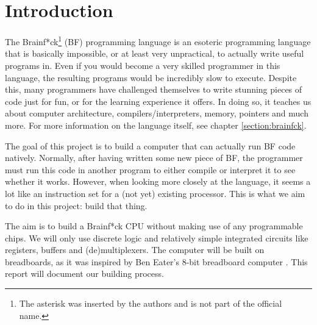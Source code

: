 \section{Introduction}
The Brainf*ck\footnote{The asterisk was inserted by the authors and is not part of the official name.} (BF) programming language is an esoteric programming language that is basically impossible, or at least very unpractical, to actually write useful programs in. Even if you would become a very skilled programmer in this language, the resulting programs would be incredibly slow to execute. Despite this, many programmers have challenged themselves to write stunning pieces of code just for fun, or for the learning experience it offers. In doing so, it teaches us about computer architecture, compilers/interpreters, memory, pointers and much more. For more information on the language itself, see chapter \ref{section:brainfck}.

The goal of this project is to build a computer that can actually run BF code natively. Normally, after having written some new piece of BF, the programmer must run this code in another program to either compile or interpret it to see whether it works. However, when looking more closely at the language, it seems a lot like an instruction set for a (not yet) existing processor. This is what we aim to do in this project: build that thing.

The aim is to build a Brainf*ck CPU without making use of any programmable chips. We will only use discrete logic and relatively simple integrated circuits like registers, buffers and (de)multiplexers. The computer will be built on breadboards, as it was inspired by Ben Eater's 8-bit breadboard computer \cite{beneater}. This report will document our building process.
